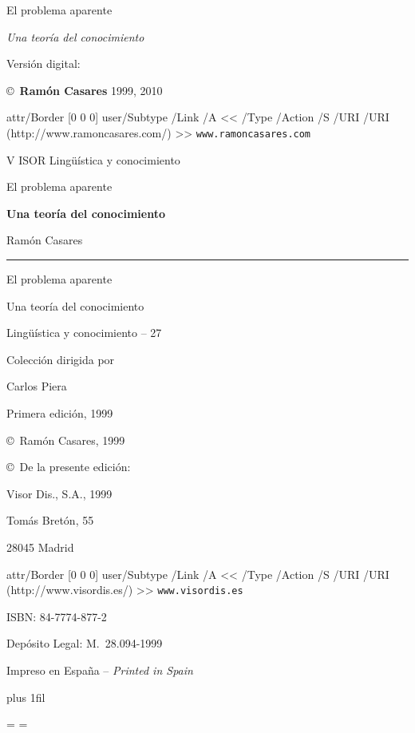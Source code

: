  {\lmtwo El problema aparente}\par
 {\sl Una teoría del conocimiento}\par
 Versión digital: \epaversion \par
 \copyright\ {\bf Ramón Casares} 1999, 2010\par
 \leavevmode \pdfcode \pdfstartlink attr{/Border [0 0 0]}
   user{/Subtype /Link /A << /Type /Action
    /S /URI /URI (http://www.ramoncasares.com/) >>}\pdfendcode
  {\tt www.ramoncasares.com}\pdfcode \pdfendlink \pdfendcode \par

\break %

\centerline{\lmxiibf V{\lmviiibf\kern-1pt ISOR}
        Lingüística y conocimiento}\newpage %


\null\newpage %

\centerline{\lmxiibf El problema aparente}
\centerline{\bf Una teoría del conocimiento}
\newpage %
\null\newpage %

\centerline{\lmone Ramón Casares}
\vskip 9pt
\hrule height 1pt
\vskip 12pt
\centerline{\lmxiizero El problema aparente}
\vskip 1pc
\centerline{\lmxiione Una teoría del conocimiento}
\vfill \break %

\centerline{\lmxiibf Lingüística y conocimiento -- 27}
\centerline{Colección dirigida por}
\centerline{Carlos Piera}
\vskip4pc
\centerline{Primera edición, 1999}
\vfil
\centerline{\copyright\ Ramón Casares, 1999}
\centerline{\copyright\ De la presente edición:}
\centerline{\sc Visor Dis., S.A., 1999}
\centerline{Tomás Bretón, 55}
\centerline{28045 Madrid}
\centerline{\pdfcode \pdfstartlink attr{/Border [0 0 0]}
   user{/Subtype /Link /A << /Type /Action
    /S /URI /URI (http://www.visordis.es/) >>}\pdfendcode
  {\tt www.visordis.es}\pdfcode \pdfendlink \pdfendcode}
\smallskip
\centerline{ISBN: 84-7774-877-2}
\centerline{Depósito Legal: M.\ 28.094-1999}
\smallskip
\centerline{Impreso en España -- \it Printed in Spain}
\break %

\vglue 0pt plus 1fil


\vskip5pc

\vfil
\vfil

\break %

\footline={\tenrm\ifodd\pageno \hfil\folio \else \folio\hfil \fi}
\footline={\tenrm\ifodd\pageno \docinfo\hfil\folio
            \else \folio\hfil\infodoc \fi\strut}
\endinput

